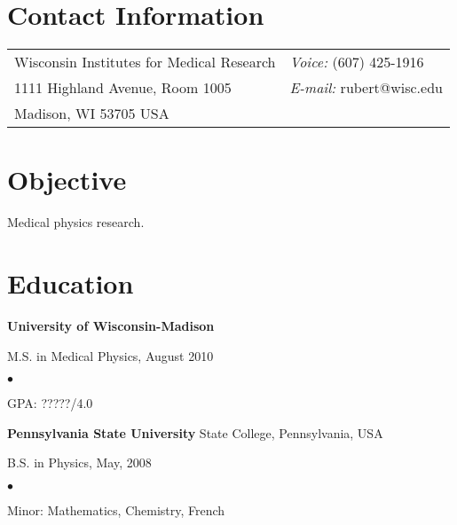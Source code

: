 \documentclass[margin,line]{res}
\newenvironment{list1}{
  \begin{list}{\ding{113}}{%
      \setlength{\itemsep}{0in}
      \setlength{\parsep}{0in} \setlength{\parskip}{0in}
      \setlength{\topsep}{0in} \setlength{\partopsep}{0in}
      \setlength{\leftmargin}{0.17in}}}{\end{list}}
\newenvironment{list2}{
  \begin{list}{$\bullet$}{%
      \setlength{\itemsep}{0in}
      \setlength{\parsep}{0in} \setlength{\parskip}{0in}
      \setlength{\topsep}{0in} \setlength{\partopsep}{0in}
      \setlength{\leftmargin}{0.2in}}}{\end{list}}
\begin{document}

\begin{resume}
\section{\sc Contact Information}
\vspace{.05in}
\begin{tabular}{@{}p{3in}p{4in}}
Wisconsin Institutes for Medical Research & {\it Voice:} (607) 425-1916 \\
1111 Highland Avenue, Room 1005 & {\it E-mail:} rubert@wisc.edu \\
Madison, WI 53705 USA \\
\end{tabular}


\section{\sc Objective}
Medical physics research.

\section{\sc Education}
{\bf University of Wisconsin-Madison} \\
\vspace*{-.1in}
\begin{list1}
\item[] M.S. in Medical Physics, August 2010
\begin{list2}
\vspace*{.05in}
\item GPA: ?????/4.0
\end{list2}
\vspace*{.05in}

\end{list1}

{\bf Pennsylvania State University} State College, Pennsylvania, USA\\
\vspace*{-.1in}
\begin{list1}
\item[] B.S. in Physics, May, 2008

\begin{list2}
 \vspace*{.05in}
 \item Minor: Mathematics, Chemistry, French
\end{list2}
\end{list1}


\end{resume}
\end{document}

